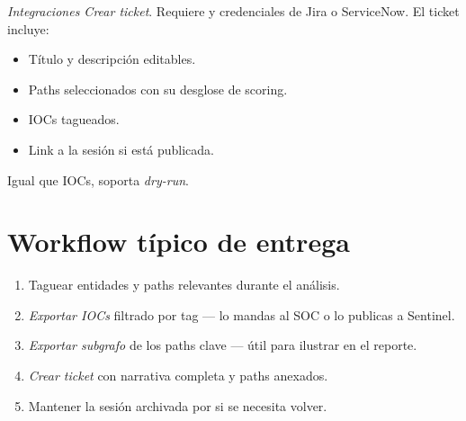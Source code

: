 \emph{Integraciones \textrightarrow{} Crear ticket}. Requiere
 y credenciales de Jira
o ServiceNow. El ticket incluye:

\begin{itemize}
    \item Título y descripción editables.
    \item Paths seleccionados con su desglose de scoring.
    \item IOCs tagueados.
    \item Link a la sesión si está publicada.
\end{itemize}

Igual que IOCs, soporta \emph{dry-run}.

\section{Workflow típico de entrega}

\begin{enumerate}
    \item Taguear entidades y paths relevantes durante el
    análisis.
    \item \emph{Exportar IOCs} filtrado por tag — lo mandas al SOC
    o lo publicas a Sentinel.
    \item \emph{Exportar subgrafo} de los paths clave — útil para
    ilustrar en el reporte.
    \item \emph{Crear ticket} con narrativa completa y paths
    anexados.
    \item Mantener la sesión archivada por si se necesita volver.
\end{enumerate}
